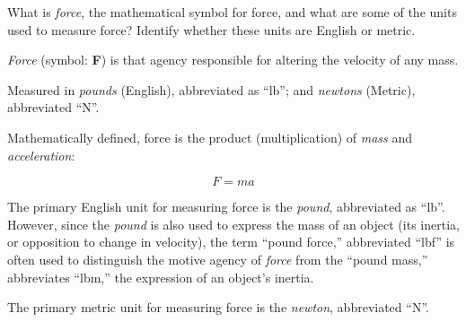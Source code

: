 

What is {\it force}, the mathematical symbol for force, and what are some of the units used to measure force?  Identify whether these units are English or metric.







{\it Force} (symbol: {\bf F}) is that agency responsible for altering the velocity of any mass.

\vskip 10pt

Measured in {\it pounds} (English), abbreviated as ``lb''; and {\it newtons} (Metric), abbreviated ``N''.







Mathematically defined, force is the product (multiplication) of {\it mass} and {\it acceleration}: 

$$F = ma$$
 
The primary English unit for measuring force is the {\it pound}, abbreviated as ``lb''.  However, since the {\it pound} is also used to express the mass of an object (its inertia, or opposition to change in velocity), the term ``pound force,'' abbreviated ``lbf'' is often used to distinguish the motive agency of {\it force} from the ``pound mass,'' abbreviates ``lbm,'' the expression of an object's inertia.
 
The primary metric unit for measuring force is the {\it newton}, abbreviated ``N''.




